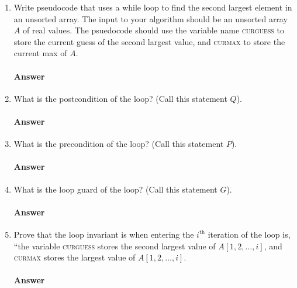 \documentclass{article}
\begin{document}
\begin{enumerate}

    \item Write pseudocode that uses a while loop to find the second largest
        element in an unsorted array.  The input to your algorithm should be an
        unsorted array $A$ of real values.  The psuedocode should use the
        variable name \textsc{curguess} to store the current guess of the second
        largest value, and \textsc{curmax} to store the current max of $A$.

        \paragraph{Answer}


    \item What is the postcondition of the loop? (Call this statement $Q$).

        \paragraph{Answer}


    \item What is the precondition of the loop? (Call this statement $P$).

        \paragraph{Answer}


    \item What is the loop guard of the loop? (Call this statement $G$).

        \paragraph{Answer}


    \item Prove that the loop invariant is when entering the $i^\text{th}$
        iteration of the loop is, ``the variable \textsc{curguess} stores
        the second
        largest value of $A[1,2, \ldots, i]$,
        and \textsc{curmax} stores the largest value of $A[1,2,\ldots, i]$.

        \paragraph{Answer}


\end{enumerate}
\end{document}
